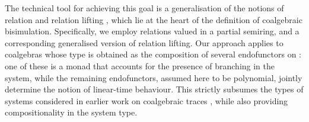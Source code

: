 \documentclass[submission,copyright,creativecommons]{eptcs}
\theoremstyle{plain}\newtheorem{theorem}{Theorem}[section]
\theoremstyle{remark}
\begin{document}
The technical tool for achieving this goal is a generalisation of the notions of relation and relation lifting \cite{HermidaJ98}, which lie at the heart of the definition of coalgebraic bisimulation. Specifically, we employ relations valued in a partial semiring, and a corresponding generalised version of relation lifting. Our approach applies to coalgebras whose type is obtained as the composition of several endofunctors on : one of these is a monad  that accounts for the presence of branching in the system, while the remaining endofunctors, assumed here to be polynomial, jointly determine the notion of linear-time behaviour. This strictly subsumes the types of systems considered in earlier work on coalgebraic traces \cite{HasuoJS07,cirstea-11,JacobsSS12}, while also providing compositionality in the system type.
\end{document}

